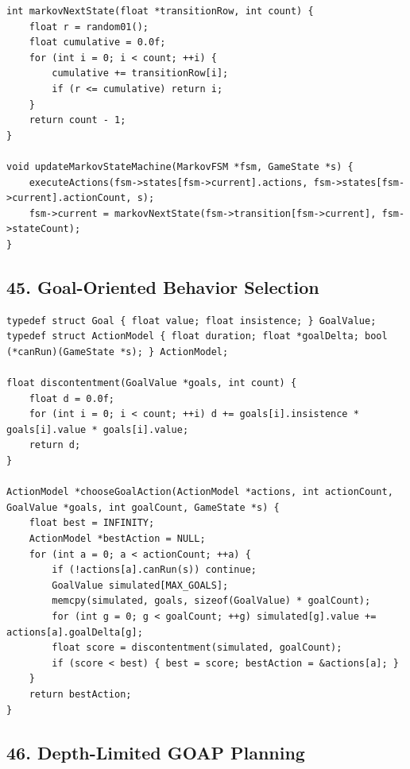 \documentclass[10pt,letterpaper]{article}
\begin{document}
\begin{verbatim}
int markovNextState(float *transitionRow, int count) {
    float r = random01();
    float cumulative = 0.0f;
    for (int i = 0; i < count; ++i) {
        cumulative += transitionRow[i];
        if (r <= cumulative) return i;
    }
    return count - 1;
}

void updateMarkovStateMachine(MarkovFSM *fsm, GameState *s) {
    executeActions(fsm->states[fsm->current].actions, fsm->states[fsm->current].actionCount, s);
    fsm->current = markovNextState(fsm->transition[fsm->current], fsm->stateCount);
}
\end{verbatim}

\subsection*{45. Goal-Oriented Behavior Selection}
{}

\begin{verbatim}
typedef struct Goal { float value; float insistence; } GoalValue;
typedef struct ActionModel { float duration; float *goalDelta; bool (*canRun)(GameState *s); } ActionModel;

float discontentment(GoalValue *goals, int count) {
    float d = 0.0f;
    for (int i = 0; i < count; ++i) d += goals[i].insistence * goals[i].value * goals[i].value;
    return d;
}

ActionModel *chooseGoalAction(ActionModel *actions, int actionCount, GoalValue *goals, int goalCount, GameState *s) {
    float best = INFINITY;
    ActionModel *bestAction = NULL;
    for (int a = 0; a < actionCount; ++a) {
        if (!actions[a].canRun(s)) continue;
        GoalValue simulated[MAX_GOALS];
        memcpy(simulated, goals, sizeof(GoalValue) * goalCount);
        for (int g = 0; g < goalCount; ++g) simulated[g].value += actions[a].goalDelta[g];
        float score = discontentment(simulated, goalCount);
        if (score < best) { best = score; bestAction = &actions[a]; }
    }
    return bestAction;
}
\end{verbatim}

\subsection*{46. Depth-Limited GOAP Planning}
{}
\end{document}
